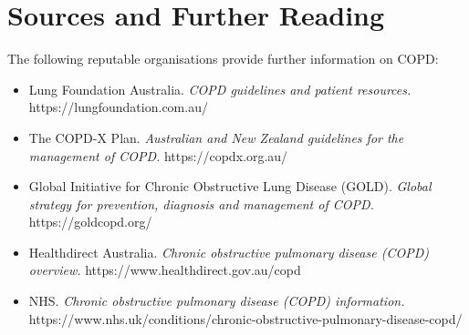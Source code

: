 \section*{Sources and Further Reading}
The following reputable organisations provide further information on COPD:
\begin{itemize}
    \item Lung Foundation Australia. \textit{COPD guidelines and patient resources.} https://lungfoundation.com.au/
    \item The COPD-X Plan. \textit{Australian and New Zealand guidelines for the management of COPD.} https://copdx.org.au/
    \item Global Initiative for Chronic Obstructive Lung Disease (GOLD). \textit{Global strategy for prevention, diagnosis and management of COPD.} https://goldcopd.org/
    \item Healthdirect Australia. \textit{Chronic obstructive pulmonary disease (COPD) overview.} https://www.healthdirect.gov.au/copd
    \item NHS. \textit{Chronic obstructive pulmonary disease (COPD) information.} https://www.nhs.uk/conditions/chronic-obstructive-pulmonary-disease-copd/
\end{itemize}
